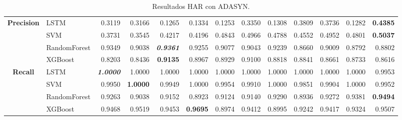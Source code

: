 \begin{table}[H]
\begin{adjustbox}{max width=14cm}
\begin{tabular}{|c|l|r|r|r|r|r|r|r|r|r|r|r|}
			\hline
			\textbf{Precision} &  LSTM &  0.3119 &  0.3166 &  0.1265 &  0.1334 &  0.1253 &  0.3350 &  0.1308 &  0.3809 &  0.3736 &  0.1282 & \textbf{  0.4385 } \\
			&  SVM &  0.3731 &  0.3545 &  0.4217 &  0.4196 &  0.4843 &  0.4966 &  0.4788 &  0.4552 &  0.4952 &  0.4801 & \textbf{  0.5037 } \\
			&  RandomForest &  0.9349 &  0.9038 & \textit{ \textbf{  0.9361 } } &  0.9255 &  0.9077 &  0.9043 &  0.9239 &  0.8660 &  0.9009 &  0.8792 &  0.8802 \\
			&  XGBoost &  0.8203 &  0.8436 & \textbf{  0.9135 } &  0.8967 &  0.8929 &  0.9100 &  0.8818 &  0.8841 &  0.8661 &  0.8733 &  0.8616 \\
			\hline
			\textbf{Recall} &  LSTM & \textit{ \textbf{  1.0000 } } &  1.0000 &  1.0000 &  1.0000 &  1.0000 &  1.0000 &  1.0000 &  1.0000 &  1.0000 &  1.0000 &  0.9953 \\
			&  SVM &  0.9950 & \textbf{  1.0000 } &  0.9949 &  1.0000 &  0.9954 &  0.9910 &  1.0000 &  0.9851 &  0.9904 &  1.0000 &  0.9952 \\
			&  RandomForest &  0.9263 &  0.9038 &  0.9152 &  0.8923 &  0.9124 &  0.9140 &  0.9290 &  0.8936 &  0.9272 &  0.9381 & \textbf{  0.9494 } \\
			&  XGBoost &  0.9468 &  0.9519 &  0.9453 & \textbf{  0.9695 } &  0.8974 &  0.9412 &  0.8995 &  0.9242 &  0.9417 &  0.9324 &  0.9507 \\
			\hline
		\end{tabular}
	\end{adjustbox}
	\caption{Resultados HAR con ADASYN.}
	\label{tab:HAR_ADASYN}
\end{table}

